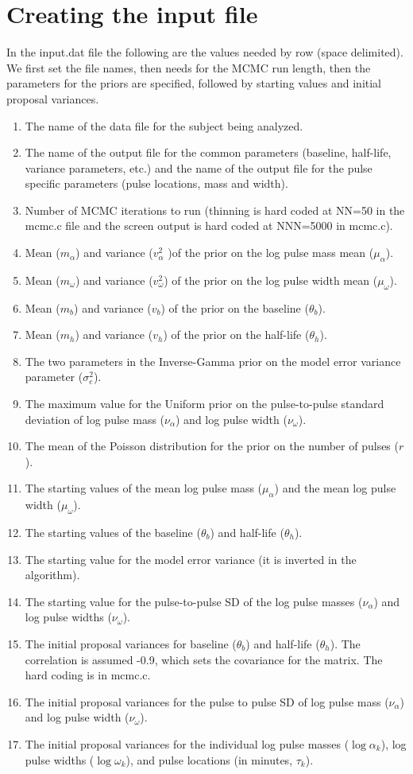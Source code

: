\documentclass[12pt, oneside]{article}   	%
\begin{document}
\section{Creating the input file}
In the input.dat file the following are the values needed by row (space delimited). We first set the file names, then needs for the MCMC run length, then the parameters for the priors are specified, followed by starting values and initial proposal variances.
\begin{enumerate}
\item The name of the data file for the subject being analyzed.
\item The name of the output file for the common parameters (baseline, half-life, variance parameters, etc.) and the name of the output file for the pulse specific parameters (pulse locations, mass and width).
\item Number of MCMC iterations to run (thinning is hard coded at NN=50 in the mcmc.c file and the screen output is hard coded at NNN=5000 in mcmc.c).
\item Mean ($m_\alpha$) and variance ($v_\alpha^2$ )of the prior on the log pulse mass mean ($\mu_\alpha$).
\item Mean ($m_\omega$) and variance ($v_\omega^2$) of the prior on the log pulse width mean ($\mu_\omega$).
\item Mean ($m_b$) and variance ($v_b$) of the prior on the baseline ($\theta_b$).
\item Mean ($m_h$) and variance ($v_h$) of the prior on the half-life ($\theta_h$).
\item The two parameters in the Inverse-Gamma prior on the model error variance parameter ($\sigma_e^2$).
\item The maximum value for the Uniform prior on the pulse-to-pulse standard deviation of log pulse mass ($\nu_\alpha$) and log pulse width ($\nu_\omega$).
\item The mean of the Poisson distribution for the prior on the number of pulses ($r$).
\item The starting values of the mean log pulse mass ($\mu_\alpha$) and the mean log pulse width ($\mu_\omega$).
\item The starting values of the baseline ($\theta_b$) and half-life ($\theta_h$).
\item The starting value for the model error variance (it is inverted in the algorithm).
\item The starting value for the pulse-to-pulse SD of the log pulse masses ($\nu_\alpha$) and log pulse widths ($\nu_\omega$).
\item The initial proposal variances for baseline ($\theta_b$) and half-life ($\theta_h$).  The correlation is assumed -0.9, which sets the covariance for the matrix. The hard coding is in mcmc.c.
\item The initial proposal variances for the pulse to pulse SD of log pulse mass ($\nu_\alpha$) and log pulse width ($\nu_\omega$).
\item The initial proposal variances for the individual log pulse masses ($\log\alpha_{k}$), log pulse widths ($\log\omega_k$), and pulse locations (in minutes, $\tau_k$).
\end{enumerate}
\end{document}
